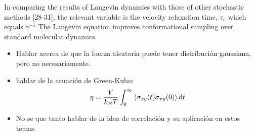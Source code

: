 \documentclass[../../main-notes.tex]{subfiles}
\begin{document}
In comparing the results of Langevin dynamics with those of other stochastic methods [28-31], the relevant variable is the velocity relaxation time, $\tau_{v}$ which equals $\gamma^{-1}$\citep{pastorTechniquesApplicationsLangevin1994}
The Langevin equation improves conformational sampling over standard molecular dynamics\citep{paquetMolecularDynamicsMonte2015}.

\begin{itemize}
    \item Hablar acerca de que la fuerza aleatoria puede tener distribución gaussiana, pero no necesariamente.
    \item hablar de la ecuación de Green-Kubo: \[\eta=\frac{V}{k_B T}\int_{0}^{\infty}\expval{\sigma_{xy}(t)\sigma_{xy}(0)}\mathrm{d}t\]
    \item No se que tanto hablar de la idea de correlación y su aplicación en estos temas.
\end{itemize}


\begin{comment}
Coso que puede ayudar en futuras re-escrituras.

--------------------------------------------
Agregar para exploraciones futuras

One should notice that the frictional term depends on the previous history of the trajectory (Markovian process). 
The friction term is important in obtaining realistic simulations, as it takes into account the viscosity of the solvent (a feature, which is absent from both MD and MC). 
If one assumes that the frictional term is constant (no history), one obtains the celebrated Langevin equation (LE):\citep{paquetMolecularDynamicsMonte2015}
--------------------------------------------

In other words, the kinetic energy is on average divided equally over the degrees of freedom, the polymers will move much more slowly than the solvent molecules\citep{Thijssen2007}



How can we model the effect of the solvent particles without taking into account their degrees of freedom explicitly? 
When a heavy particle is moving through the solvent, it will encounter more solvent particles at the front than at the back. 
Therefore, the collisions with the solvent particles will on average have the effect of a friction force proportional and opposite to the velocity of the heavy particle.\citep{Thijssen2007}

Reference [34] presents the Langevin equation for polymers engaged in polymerization/depolymerization reactions, by establishing a random diffusion coefficient that correlates with particle size. Reference [35] presents the Langevin equations for continuous time Lévy walks. X. D. Wang et al.present the Langevin description of the Lévy walk [36]. Y. Chen et al.then provide the Langevin description of the Lévy walk with memory [37] and examine the impact of an external force [38,39]\citep{wangMultiscaleModelingSimulation2025}.

\end{comment}
\end{document}
